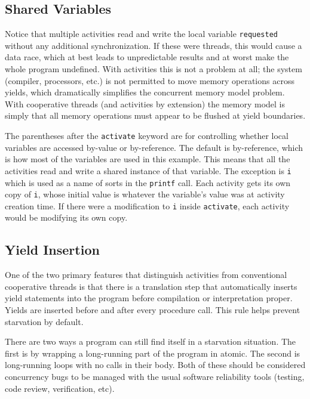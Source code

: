 \documentclass[9pt,preprint]{sigplanconf}
\begin{document}

\subsection{Shared Variables}

Notice that multiple activities read and write the local variable \texttt{requested} without any additional synchronization.
If these were threads, this would cause a data race, which at best leads to unpredictable results and at worst make the whole program undefined.
With activities this is not a problem at all; the system (compiler, processors, etc.) is not permitted to move memory operations across yields, which dramatically simplifies the concurrent memory model problem.
With cooperative threads (and activities by extension) the memory model is simply that all memory operations must appear to be flushed at yield boundaries.

The parentheses after the \texttt{activate} keyword are for controlling whether local variables are accessed by-value or by-reference.
The default is by-reference, which is how most of the variables are used in this example.
This means that all the activities read and write a shared instance of that variable.
The exception is \texttt{i} which is used as a name of sorts in the \texttt{printf} call.
Each activity gets its own copy of \texttt{i}, whose initial value is whatever the variable's value was at activity creation time.
If there were a modification to \texttt{i} inside \texttt{activate}, each activity would be modifying its own copy.

\subsection{Yield Insertion}

One of the two primary features that distinguish activities from conventional cooperative threads is that there is a translation step that automatically inserts yield statements into the program before compilation or interpretation proper.
Yields are inserted before and after every procedure call.
This rule helps prevent starvation by default.

There are two ways a program can still find itself in a starvation situation.
The first is by wrapping a long-running part of the program in atomic.
The second is long-running loops with no calls in their body.
Both of these should be considered concurrency bugs to be managed with the usual software reliability tools (testing, code review, verification, etc).
\end{document}
